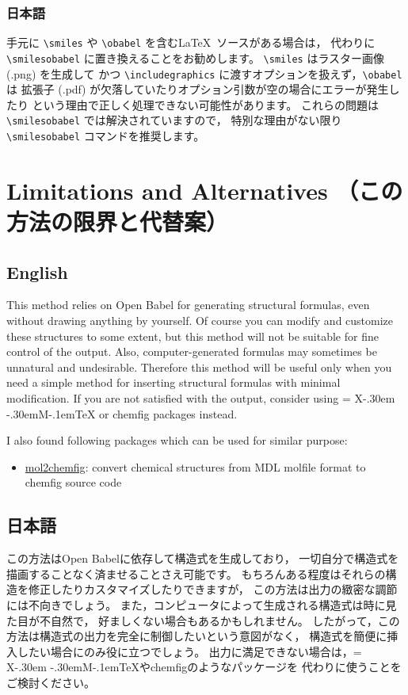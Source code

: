 \documentclass[12pt]{ltjsarticle}
\def\XyM{\ifnum\fam=-1\relax\fam=0\relax\fi\TestCount=\fam%
X\kern-.30em\smash{\raise.50ex\hbox{$\fam\TestCount\Upsilon$}}%
\kern-.30em{M}}
\def\XyMTeX{\XyM\kern-.1em\TeX}
\begin{document}
\subsubsection{日本語}

手元に \verb|\smiles| や \verb|\obabel| を含む\LaTeX\ ソースがある場合は，
代わりに \verb|\smilesobabel| に置き換えることをお勧めします。
\verb|\smiles| はラスター画像 (.png) を生成して
かつ \verb|\includegraphics| に渡すオプションを扱えず，\verb|\obabel| は
拡張子 (.pdf) が欠落していたりオプション引数が空の場合にエラーが発生したり
という理由で正しく処理できない可能性があります。
これらの問題は \verb|\smilesobabel| では解決されていますので，
特別な理由がない限り \verb|\smilesobabel| コマンドを推奨します。

\clearpage

\section{Limitations and Alternatives （この方法の限界と代替案）}

\subsection{English}

This method relies on Open Babel for generating structural formulas,
even without drawing anything by yourself.
Of course you can modify and customize these structures to some extent,
but this method will not be suitable for fine control of the output.
Also, computer-generated formulas may sometimes be unnatural and undesirable.
Therefore this method will be useful only when you need a simple method
for inserting structural formulas with minimal modification.
If you are not satisfied with the output, consider using {\XyMTeX} or
\textsf{chemfig} packages instead.

I also found following packages which can be used for similar purpose:
\begin{itemize}
  \item \href{http://www.ctan.org/pkg/mol2chemfig}{\textsf{mol2chemfig}}:
    convert chemical structures from MDL molfile format
    to \textsf{chemfig} source code
\end{itemize}

\subsection{日本語}

この方法はOpen Babelに依存して構造式を生成しており，
一切自分で構造式を描画することなく済ませることさえ可能です。
もちろんある程度はそれらの構造を修正したりカスタマイズしたりできますが，
この方法は出力の緻密な調節には不向きでしょう。
また，コンピュータによって生成される構造式は時に見た目が不自然で，
好ましくない場合もあるかもしれません。
したがって，この方法は構造式の出力を完全に制御したいという意図がなく，
構造式を簡便に挿入したい場合にのみ役に立つでしょう。
出力に満足できない場合は，\XyMTeX や\textsf{chemfig}のようなパッケージを
代わりに使うことをご検討ください。
\end{document}
